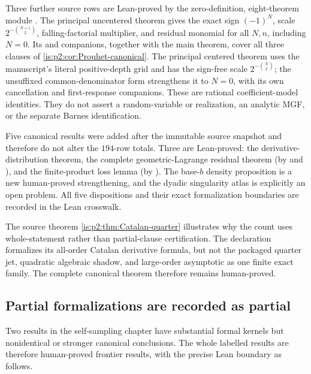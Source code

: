 Three further source rows are Lean-proved by the zero-definition,
eight-theorem module
.  The principal
uncentered theorem gives the exact sign $(-1)^N$, scale
$2^{-\binom{N+1}{2}}$, falling-factorial multiplier, and residual monomial
for all $N,n$, including $N=0$.  Its  and 
companions, together with the main theorem, cover all three clauses of
\cref{is:p2:cor:Prouhet-canonical}.  The principal centered
 theorem uses the manuscript's literal positive-depth grid and
has the sign-free scale $2^{-\binom{N}{2}}$; the unsuffixed common-denominator
form strengthens it to $N=0$, with its own cancellation and first-response
companions.  These are rational coefficient-model identities.  They do not
assert a random-variable or  realization, an analytic MGF, or
the separate Barnes identification.

Five canonical results were added after the immutable source snapshot and
therefore do not alter the \(194\)-row totals.  Three are Lean-proved:
the derivative-distribution theorem, the complete geometric-Lagrange residual
theorem (by
 and
), and the finite-product
loss lemma (by
).
The base-\(b\) density proposition is a new human-proved strengthening, and
the dyadic singularity atlas is explicitly an open problem.  All five
dispositions and their exact formalization boundaries are recorded in the
Lean crosswalk.

The source theorem \cref{is:p2:thm:Catalan-quarter} illustrates why the count
uses whole-statement rather than partial-clause certification.  The declaration
formalizes its all-order Catalan derivative formula, but not the packaged
quarter jet, quadratic algebraic shadow, and large-order asymptotic as one
finite exact family.  The complete canonical theorem therefore remains
human-proved.

\subsection{Partial formalizations are recorded as partial}

Two results in the self-sampling chapter have substantial formal kernels
but nonidentical or stronger canonical conclusions.  The whole labelled
results are therefore human-proved frontier results, with the precise Lean
boundary as follows.


